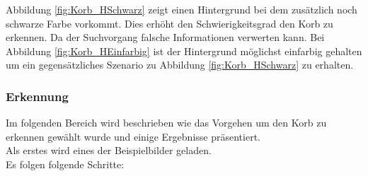 Abbildung \ref{fig:Korb_HSchwarz} zeigt einen Hintergrund bei dem zusätzlich noch schwarze Farbe vorkommt. Dies erhöht den Schwierigkeitsgrad  den Korb zu erkennen. Da der Suchvorgang falsche Informationen verwerten kann. Bei Abbildung \ref{fig:Korb_HEinfarbig} ist der Hintergrund möglichst einfarbig gehalten um ein gegensätzliches Szenario zu Abbildung \ref{fig:Korb_HSchwarz} zu erhalten.

\subsubsection{Erkennung}
Im folgenden Bereich wird beschrieben wie das Vorgehen um den Korb zu erkennen gewählt wurde und einige Ergebnisse präsentiert.\\
%
Als erstes wird eines der Beispielbilder geladen.\\
%
Es folgen folgende Schritte:\\
%
